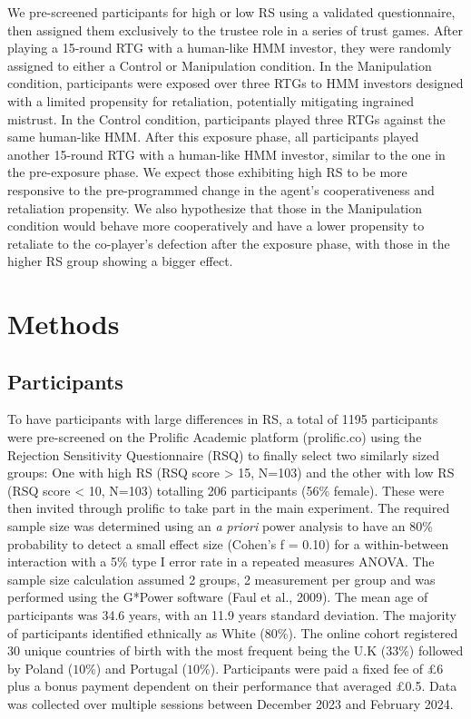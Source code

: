 \documentclass[
]{article}
\begin{document}
We pre-screened participants for high or low RS using a validated
questionnaire, then assigned them exclusively to the trustee role in a
series of trust games. After playing a 15-round RTG with a human-like
HMM investor, they were randomly assigned to either a Control or
Manipulation condition. In the Manipulation condition, participants were
exposed over three RTGs to HMM investors designed with a limited
propensity for retaliation, potentially mitigating ingrained mistrust.
In the Control condition, participants played three RTGs against the
same human-like HMM. After this exposure phase, all participants played
another 15-round RTG with a human-like HMM investor, similar to the one
in the pre-exposure phase. We expect those exhibiting high RS to be more
responsive to the pre-programmed change in the agent's cooperativeness
and retaliation propensity. We also hypothesize that those in the
Manipulation condition would behave more cooperatively and have a lower
propensity to retaliate to the co-player's defection after the exposure
phase, with those in the higher RS group showing a bigger effect.

\section{Methods}\label{methods}

\subsection{Participants}\label{participants}

To have participants with large differences in RS, a total of 1195
participants were pre-screened on the Prolific Academic platform
(prolific.co) using the Rejection Sensitivity Questionnaire (RSQ) to
finally select two similarly sized groups: One with high RS (RSQ score
\textgreater{} 15, N=103) and the other with low RS (RSQ score \textless{} 10, N=103)
totalling 206 participants (56\% female). These were then invited through
prolific to take part in the main experiment. The required sample size
was determined using an \emph{a priori} power analysis to have an 80\%
probability to detect a small effect size (Cohen's f = 0.10) for a
within-between interaction with a 5\% type I error rate in a repeated
measures ANOVA. The sample size calculation assumed 2 groups, 2
measurement per group and was performed using the G*Power software
(Faul et al., 2009). The mean age of participants was 34.6 years,
with an 11.9 years standard deviation. The majority of participants
identified ethnically as White (\(80\)\%). The online cohort registered 30
unique countries of birth with the most frequent being the U.K (\(33\)\%)
followed by Poland (\(10\)\%) and Portugal (\(10\)\%). Participants were paid
a fixed fee of £6 plus a bonus payment dependent on their performance
that averaged £0.5. Data was collected over multiple sessions between
December 2023 and February 2024.
\end{document}
